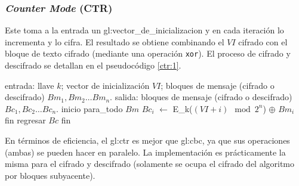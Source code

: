 %
%

\subsubsection{\textit{Counter Mode} (CTR)}
\label{sec:ctr}

Este toma a la entrada un \gls{gl:vector_de_inicializacion} y en cada iteración
lo incrementa y lo cifra. El resultado se obtiene combinando el $ VI $ cifrado
con el bloque de texto cifrado (mediante una operación \verb|xor|). El proceso
de cifrado y descifrado se detallan en el pseudocódigo \ref{ctr:1}.

\begin{pseudocodigo}[%
    caption={\Gls{gl:modo_de_operacion} \gls{gl:ctr}%
      (cifrado y descifrado).},
    label={ctr:1}%
  ]
    entrada: llave $ k $; vector de inicialización $ VI $;
             bloques de mensaje (cifrado o descifrado) $ Bm_1, Bm_2 \dots Bm_n $.
    salida:  bloques de mensaje (cifrado o descifrado) $ Bc_1, Bc_2 \dots Bc_n $.
    inicio
      para_todo $Bm$
        $Bc_i$ $\gets$ E_k($ (VI + i) \mod 2^n $) $\oplus$ $Bm_i$
      fin
      regresar $Bc$
    fin
\end{pseudocodigo}

En términos de eficiencia, el \gls{gl:ctr} es mejor que \gls{gl:cbc}, ya que
sus operaciones (ambas) se pueden hacer en paralelo. La implementación es
prácticamente la misma para el cifrado y descifrado (solamente se ocupa el
cifrado del algoritmo por bloques subyacente).
